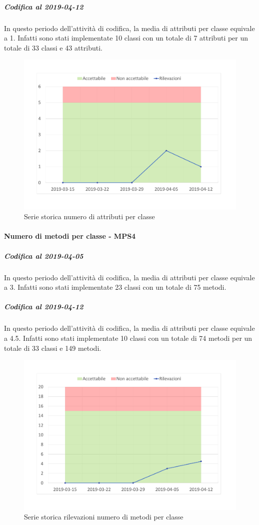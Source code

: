 \subparagraph{Codifica al 2019-04-12}
In questo periodo dell'attività di codifica, la media di attributi per classe equivale a 1. Infatti sono stati implementate 10 classi con un totale di 7 attributi per un totale di 33 classi e 43 attributi.
\begin{figure}[H]
	\centering
	\includegraphics[scale=0.6]{images/resoconto/MPS3Chart.pdf}
	\caption{Serie storica numero di attributi per classe}	
\end{figure}

\paragraph{Numero di metodi per classe - MPS4}
\subparagraph{Codifica al 2019-04-05}
In questo periodo dell'attività di codifica, la media di attributi per classe equivale a 3. Infatti sono stati implementate 23 classi con un totale di 75 metodi.

\subparagraph{Codifica al 2019-04-12}
In questo periodo dell'attività di codifica, la media di attributi per classe equivale a 4.5. Infatti sono stati implementate 10 classi con un totale di 74 metodi per un totale di 33 classi e 149 metodi.
\begin{figure}[H]
	\centering
	\includegraphics[scale=0.6]{images/resoconto/MPS4Chart.pdf}
	\caption{Serie storica rilevazioni numero di metodi per classe}	
\end{figure}

